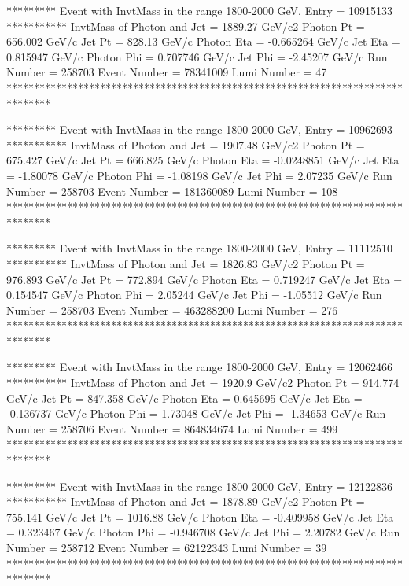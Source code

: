                                                                      
********* Event with InvtMass in the range 1800-2000 GeV, Entry = 10915133 ***********
InvtMass of Photon and Jet = 1889.27 GeV/c2
Photon Pt = 656.002 GeV/c
Jet Pt = 828.13 GeV/c
Photon Eta = -0.665264 GeV/c
Jet Eta = 0.815947 GeV/c
Photon Phi = 0.707746 GeV/c
Jet Phi = -2.45207 GeV/c
Run Number = 258703
Event Number = 78341009
Lumi Number = 47
********************************************************************************
                                                                     
                                                                     
********* Event with InvtMass in the range 1800-2000 GeV, Entry = 10962693 ***********
InvtMass of Photon and Jet = 1907.48 GeV/c2
Photon Pt = 675.427 GeV/c
Jet Pt = 666.825 GeV/c
Photon Eta = -0.0248851 GeV/c
Jet Eta = -1.80078 GeV/c
Photon Phi = -1.08198 GeV/c
Jet Phi = 2.07235 GeV/c
Run Number = 258703
Event Number = 181360089
Lumi Number = 108
********************************************************************************
                                                                     
                                                                     
********* Event with InvtMass in the range 1800-2000 GeV, Entry = 11112510 ***********
InvtMass of Photon and Jet = 1826.83 GeV/c2
Photon Pt = 976.893 GeV/c
Jet Pt = 772.894 GeV/c
Photon Eta = 0.719247 GeV/c
Jet Eta = 0.154547 GeV/c
Photon Phi = 2.05244 GeV/c
Jet Phi = -1.05512 GeV/c
Run Number = 258703
Event Number = 463288200
Lumi Number = 276
********************************************************************************
                                                                     
                                                                     
********* Event with InvtMass in the range 1800-2000 GeV, Entry = 12062466 ***********
InvtMass of Photon and Jet = 1920.9 GeV/c2
Photon Pt = 914.774 GeV/c
Jet Pt = 847.358 GeV/c
Photon Eta = 0.645695 GeV/c
Jet Eta = -0.136737 GeV/c
Photon Phi = 1.73048 GeV/c
Jet Phi = -1.34653 GeV/c
Run Number = 258706
Event Number = 864834674
Lumi Number = 499
********************************************************************************
                                                                     
                                                                     
********* Event with InvtMass in the range 1800-2000 GeV, Entry = 12122836 ***********
InvtMass of Photon and Jet = 1878.89 GeV/c2
Photon Pt = 755.141 GeV/c
Jet Pt = 1016.88 GeV/c
Photon Eta = -0.409958 GeV/c
Jet Eta = 0.323467 GeV/c
Photon Phi = -0.946708 GeV/c
Jet Phi = 2.20782 GeV/c
Run Number = 258712
Event Number = 62122343
Lumi Number = 39
********************************************************************************
                                                                     
